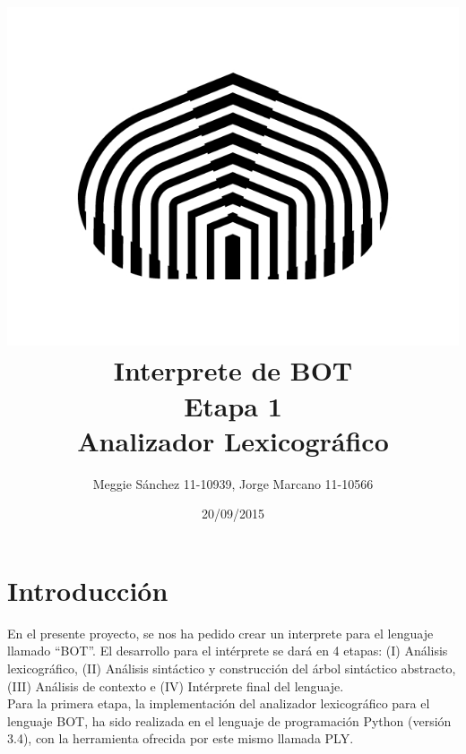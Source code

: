 \documentclass{article}
\title{}
\author{}
\date{}
\begin{document}
\vspace{1.5cm}
 
\title{ \includegraphics[scale=0.3]{usb}  \\ Interprete de BOT \\ Etapa 1 \\ Analizador Lexicográfico }

\author{Meggie Sánchez 11-10939, Jorge Marcano 11-10566} 

\date{20/09/2015}

\maketitle

\newpage

\section{Introducción}
\hspace{0.5cm} 	En el presente proyecto, se nos ha pedido crear un interprete para el lenguaje llamado “BOT”. El desarrollo para el intérprete se dará en 4 etapas: (I) Análisis lexicográfico, (II) Análisis sintáctico y construcción del árbol sintáctico abstracto, (III) Análisis de contexto e (IV) Intérprete final del lenguaje. \\

\hspace{0.5cm} Para la primera etapa, la implementación del analizador lexicográfico para el lenguaje BOT, ha sido realizada en el lenguaje de programación Python (versión 3.4), con la herramienta ofrecida por este mismo llamada PLY. 
\end{document}
